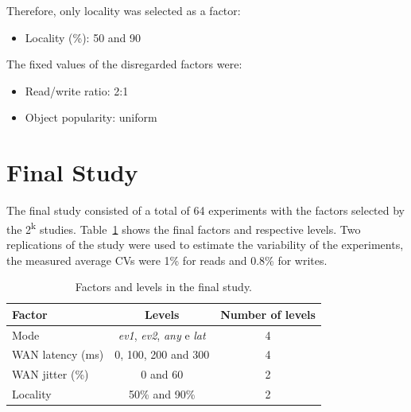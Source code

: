 \documentclass[doublespacing]{bmcart}
\begin{document}
Therefore, only locality was selected as a factor:

\begin{itemize}

\item Locality (\%): 50 and 90

\end{itemize}

The fixed values of the disregarded factors were:

\begin{itemize}

\item Read/write ratio: 2:1

\item Object popularity: uniform

\end{itemize}

\section{Final Study}

The final study consisted of a total of 64 experiments with the factors
selected by the 2\textsuperscript{k} studies.
Table~\ref{tab:fatores_e_niveis_do_estudo_final} shows the final factors and
respective levels. Two replications of the study were used to estimate the
variability of the experiments, the measured average CVs were 1\% for reads and
0.8\% for writes.

\begin{table}[h!]
\caption{Factors and levels in the final study.}
\begin{tabular}{lcc} \hline

Factor & Levels & Number of levels\\\hline

Mode & \textit{ev1}, \textit{ev2}, \textit{any} e \textit{lat} & 4\\

WAN latency (ms) & 0, 100, 200 and 300 & 4\\

WAN jitter (\%) & 0 and 60 & 2\\

Locality & 50\% and 90\% & 2\\\hline

\end{tabular}

\label{tab:fatores_e_niveis_do_estudo_final}

\end{table}
\end{document}

